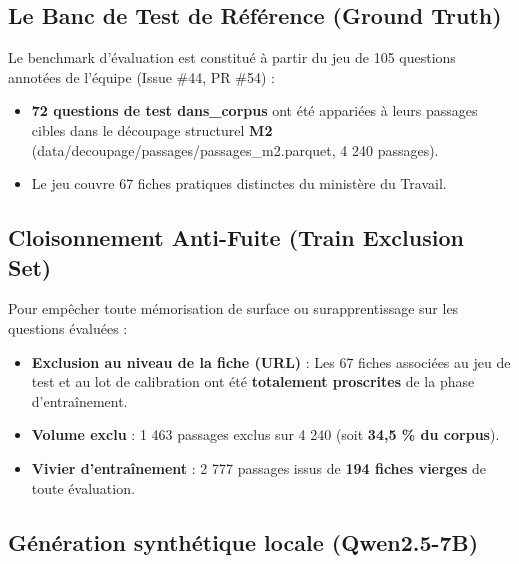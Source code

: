 \documentclass[11pt,a4paper]{article}
\newcommand{\code}[1]  {{\ttfamily #1}}
\begin{document}
\subsection{Le Banc de Test de Référence (Ground Truth)}

Le benchmark d'évaluation est constitué à partir du jeu de 105 questions annotées de l'équipe (Issue \#44, PR \#54) :
\begin{itemize}
\item \textbf{72 questions de test \code{dans\_\allowbreak{}corpus}} ont été appariées à leurs passages cibles dans le découpage structurel \textbf{M2} (\code{data/\allowbreak{}decoupage/\allowbreak{}passages/\allowbreak{}passages\_\allowbreak{}m2.\allowbreak{}parquet}, 4 240 passages).
\item Le jeu couvre 67 fiches pratiques distinctes du ministère du Travail.
\end{itemize}

\subsection{Cloisonnement Anti-Fuite (Train Exclusion Set)}

Pour empêcher toute mémorisation de surface ou surapprentissage sur les questions évaluées :
\begin{itemize}
\item \textbf{Exclusion au niveau de la fiche (URL)} : Les 67 fiches associées au jeu de test et au lot de calibration ont été \textbf{totalement proscrites} de la phase d'entraînement.
\item \textbf{Volume exclu} : 1 463 passages exclus sur 4 240 (soit \textbf{34,5 \% du corpus}).
\item \textbf{Vivier d'entraînement} : 2 777 passages issus de \textbf{194 fiches vierges} de toute évaluation.
\end{itemize}

\subsection{Génération synthétique locale (Qwen2.5-7B)}
\end{document}
